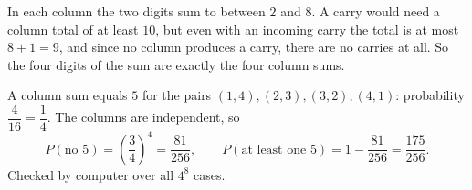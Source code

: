 In each column the two digits sum to between $2$ and $8$. A carry would need a column total of at least $10$, but even with an incoming carry the total is at most $8+1=9$, and since no column produces a carry, there are no carries at all. So the four digits of the sum are exactly the four column sums.

A column sum equals $5$ for the pairs $(1,4),(2,3),(3,2),(4,1)$: probability $\dfrac{4}{16}=\dfrac{1}{4}$. The columns are independent, so
\[
P(\text{no }5)=\left(\dfrac{3}{4}\right)^4=\dfrac{81}{256},\qquad P(\text{at least one }5)=1-\dfrac{81}{256}=\boxed{\dfrac{175}{256}}.
\]
Checked by computer over all $4^8$ cases.
